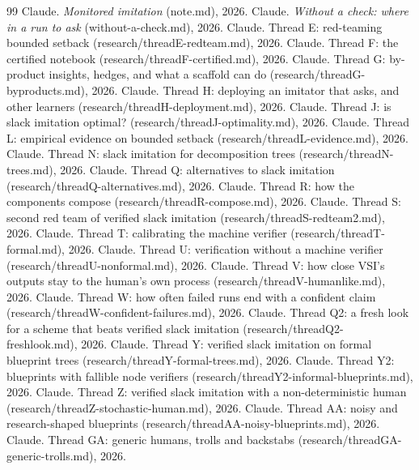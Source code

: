 \documentclass[11pt]{article}
\theoremstyle{definition}
\theoremstyle{remark}
\begin{document}
\begin{thebibliography}{99}
 Claude. \emph{Monitored imitation} (note.md), 2026.
 Claude. \emph{Without a check: where in a run to ask} (without-a-check.md), 2026.
 Claude. Thread E: red-teaming bounded setback (research/threadE-redteam.md), 2026.
 Claude. Thread F: the certified notebook (research/threadF-certified.md), 2026.
 Claude. Thread G: by-product insights, hedges, and what a scaffold can do (research/threadG-byproducts.md), 2026.
 Claude. Thread H: deploying an imitator that asks, and other learners (research/threadH-deployment.md), 2026.
 Claude. Thread J: is slack imitation optimal? (research/threadJ-optimality.md), 2026.
 Claude. Thread L: empirical evidence on bounded setback (research/threadL-evidence.md), 2026.
 Claude. Thread N: slack imitation for decomposition trees (research/threadN-trees.md), 2026.
 Claude. Thread Q: alternatives to slack imitation (research/threadQ-alternatives.md), 2026.
 Claude. Thread R: how the components compose (research/threadR-compose.md), 2026.
 Claude. Thread S: second red team of verified slack imitation (research/threadS-redteam2.md), 2026.
 Claude. Thread T: calibrating the machine verifier (research/threadT-formal.md), 2026.
 Claude. Thread U: verification without a machine verifier (research/threadU-nonformal.md), 2026.
 Claude. Thread V: how close VSI's outputs stay to the human's own process (research/threadV-humanlike.md), 2026.
 Claude. Thread W: how often failed runs end with a confident claim (research/threadW-confident-failures.md), 2026.
 Claude. Thread Q2: a fresh look for a scheme that beats verified slack imitation (research/threadQ2-freshlook.md), 2026.
 Claude. Thread Y: verified slack imitation on formal blueprint trees (research/threadY-formal-trees.md), 2026.
 Claude. Thread Y2: blueprints with fallible node verifiers (research/threadY2-informal-blueprints.md), 2026.
 Claude. Thread Z: verified slack imitation with a non-deterministic human (research/threadZ-stochastic-human.md), 2026.
 Claude. Thread AA: noisy and research-shaped blueprints (research/threadAA-noisy-blueprints.md), 2026.
 Claude. Thread GA: generic humans, trolls and backstabs (research/threadGA-generic-trolls.md), 2026.

\end{thebibliography}
\end{document}
